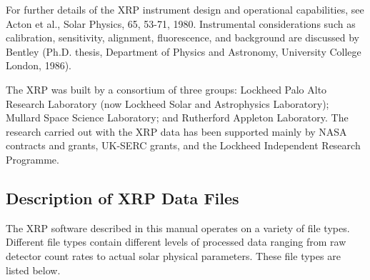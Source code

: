 For further details of the XRP instrument design and operational capabilities,
see Acton et al., Solar Physics, 65, 53-71, 1980. Instrumental considerations
such as calibration, sensitivity, alignment, fluorescence, and background are 
discussed by Bentley (Ph.D. thesis, Department of Physics and Astronomy,
University College London, 1986). 

The XRP was built by a consortium of three groups: Lockheed Palo Alto Research
Laboratory (now Lockheed Solar and Astrophysics Laboratory); Mullard Space
Science Laboratory; and Rutherford Appleton Laboratory. The research carried
out with the XRP data has been supported mainly by NASA contracts and grants,
UK-SERC grants, and the Lockheed Independent Research Programme. 

\newpage

\subsection{Description of XRP Data Files} 

The XRP software described in this manual operates on a variety of
file types. Different file types contain different levels of processed
data ranging from raw detector count rates to actual solar physical parameters.
These file types are listed below.

